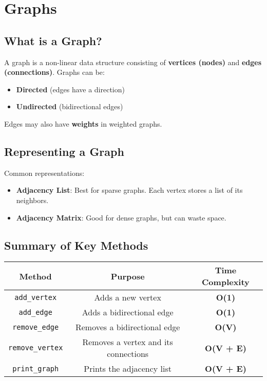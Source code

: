 \section{Graphs}

\subsection{What is a Graph?}
A graph is a non-linear data structure consisting of \textbf{vertices (nodes)} and \textbf{edges (connections)}. Graphs can be:
\begin{itemize}
    \item \textbf{Directed} (edges have a direction)
    \item \textbf{Undirected} (bidirectional edges)
\end{itemize}
Edges may also have \textbf{weights} in weighted graphs.

\subsection{Representing a Graph}
Common representations:
\begin{itemize}
    \item \textbf{Adjacency List}: Best for sparse graphs. Each vertex stores a list of its neighbors.
    \item \textbf{Adjacency Matrix}: Good for dense graphs, but can waste space.
\end{itemize}

\subsection{Summary of Key Methods}
\begin{tabular}{|c|c|c|}
    \hline
    \textbf{Method} & \textbf{Purpose} & \textbf{Time Complexity} \\
    \hline
    \texttt{add\_vertex} & Adds a new vertex & \textbf{O(1)} \\
    \hline
    \texttt{add\_edge} & Adds a bidirectional edge & \textbf{O(1)} \\
    \hline
    \texttt{remove\_edge} & Removes a bidirectional edge & \textbf{O(V)} \\
    \hline
    \texttt{remove\_vertex} & Removes a vertex and its connections & \textbf{O(V + E)} \\
    \hline
    \texttt{print\_graph} & Prints the adjacency list & \textbf{O(V + E)} \\
    \hline
\end{tabular}

